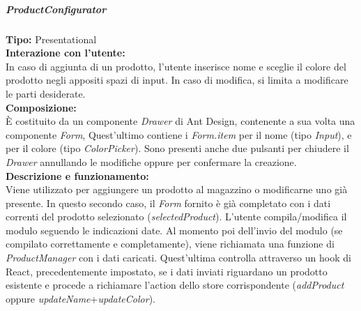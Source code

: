 \subparagraph{\colorbox{verde_uml}{ProductConfigurator}}
\textbf{Tipo:} Presentational \\
\textbf{Interazione con l'utente:} \\
In caso di aggiunta di un prodotto, l'utente inserisce nome e sceglie il colore del prodotto negli appositi spazi di input. In caso di modifica, si limita a modificare le parti desiderate. \\
\textbf{Composizione:} \\
È costituito da un componente \textit{Drawer} di Ant Design, contenente a sua volta una componente \textit{Form}, Quest'ultimo 
contiene i \textit{Form.item} per il nome (tipo \textit{Input}), 
e per il colore (tipo \textit{ColorPicker}). Sono presenti anche due pulsanti per chiudere il \textit{Drawer} annullando le modifiche oppure per confermare la creazione.\\
\textbf{Descrizione e funzionamento:} \\
Viene utilizzato per aggiungere un prodotto al magazzino o modificarne uno già presente. In questo secondo caso, il \textit{Form} fornito è già completato con i dati correnti del prodotto selezionato (\textit{selectedProduct}). L'utente compila/modifica il modulo seguendo le indicazioni date. Al momento poi dell'invio del modulo (se compilato correttamente e completamente), viene richiamata una funzione di \textit{ProductManager} con i dati caricati. Quest'ultima controlla attraverso un hook di React, precedentemente impostato, se i dati inviati riguardano un prodotto esistente e procede a richiamare l'action dello store corrispondente (\textit{addProduct} oppure \textit{updateName}+\textit{updateColor}).

